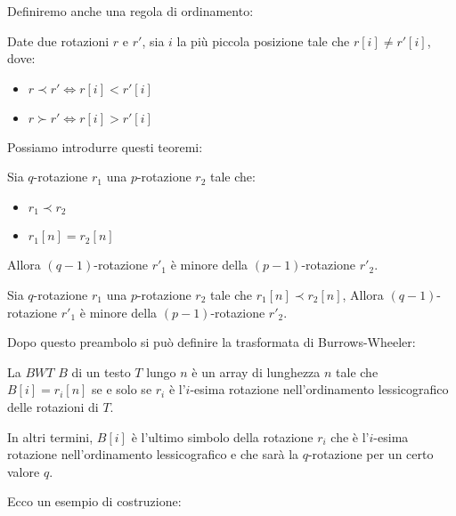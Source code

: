 Definiremo anche una regola di ordinamento:
\begin{definizione}
    Date due rotazioni $r$ e $r'$, sia $i$ la più piccola posizione tale che
    $r[i]\ne r'[i]$, dove:
    \begin{itemize}
        \item $r \prec r'\iff r[i] < r'[i]$
        \item $r \succ r'\iff r[i] > r'[i]$
    \end{itemize}
\end{definizione}
Possiamo introdurre questi teoremi:
\begin{teorema}
    \label{th:ord-rot-1}
    Sia $q$-rotazione $r_1$ una $p$-rotazione $r_2$ tale che:
    \begin{itemize}
        \item $r_1 \prec r_2$
        \item $r_1[n] = r_2[n]$
    \end{itemize}
    Allora $(q - 1)$-rotazione $r'_1$ è minore della $(p - 1)$-rotazione $r'_2$.
\end{teorema}
\begin{teorema}
    \label{th:ord-rot-2}
    Sia $q$-rotazione $r_1$ una $p$-rotazione $r_2$ tale che $r_1[n] \prec r_2[n]$,
    Allora $(q - 1)$-rotazione $r'_1$ è minore della $(p - 1)$-rotazione $r'_2$.
\end{teorema}
Dopo questo preambolo si può definire la trasformata di Burrows-Wheeler:
\begin{definizione}
    La $BWT$ $B$ di un testo $T$ lungo $n$ è un array di lunghezza $n$ tale che
    $B[i] = r_i[n]$ se e solo se $r_i$ è l'$i$-esima rotazione nell'ordinamento
    lessicografico delle rotazioni di $T$.

    In altri termini, $B[i]$ è l'ultimo simbolo della rotazione $r_i$ che è
    l'$i$-esima rotazione nell'ordinamento lessicografico e che sarà la
    $q$-rotazione per un certo valore $q$.
\end{definizione}
Ecco un esempio di costruzione:
